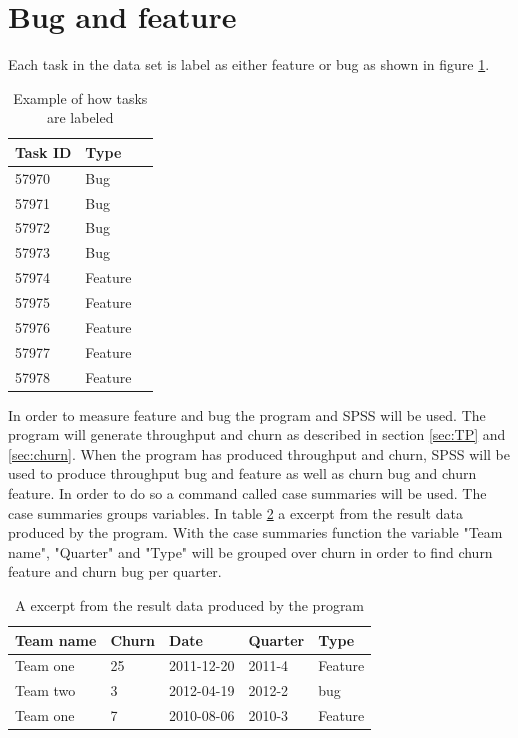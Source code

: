 \documentclass[UKenglish]{ifimaster}  %
\begin{document}
\section {Bug and feature}
\label{sec:bug}
Each task in the data set is label as either feature or bug as shown in figure \ref{bugsT}. 

\begin{table}[ht]
\begin{center}
    \begin{tabular}{| l | l | p{5cm} |}
    \hline
    Task ID & Type \\ \hline
57970 &	Bug\\ \hline
57971&	Bug\\ \hline
57972&	Bug\\ \hline
57973&	Bug\\ \hline
57974&	Feature\\ \hline
57975&	Feature\\ \hline
57976&	Feature\\ \hline
57977&	Feature\\ \hline
57978&	Feature\\ \hline
    \end{tabular}
\caption{Example of how tasks are labeled}
\label{bugsT} %
\end{center}
\end{table}

In order to measure feature and bug the program and SPSS will be used. The program will generate throughput and churn as described in section \ref{sec:TP} and \ref{sec:churn}. When the program has produced throughput and churn, SPSS will be used to produce throughput bug and feature as well as churn bug and churn feature. In order to do so a command called case summaries will be used. The case summaries groups variables. In table \ref{tab:ftb} a excerpt from the result data produced by the program.  With the case summaries function the variable "Team name", "Quarter" and "Type" will be grouped over churn in order to find churn feature and churn bug per quarter. 


\begin{table}[!ht]
\center
\begin{tabular}{ | l | l | l | l | l | }
\hline
	Team name & Churn & Date & Quarter & Type \\ \hline
	Team one & 25 &2011-12-20& 2011-4 & Feature \\ \hline
	Team two & 3 &2012-04-19 & 2012-2 & bug \\ \hline
	Team one & 7 & 2010-08-06 & 2010-3 & Feature \\ \hline
\end{tabular}
\caption{A excerpt from the result data produced by the program }
\label{tab:ftb} 
\end{table}
\end{document}

